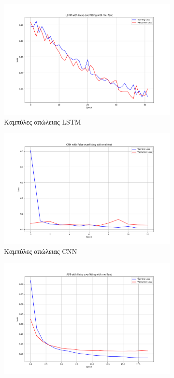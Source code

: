 \documentclass[a4paper,12pt]{article}
\begin{document}
\begin{figure}[H]
    \centering
    \begin{subfigure}[b]{0.32\textwidth}
        \includegraphics[width=\textwidth]{images/LSTM with False overfitting with mel feat.png}
        \caption{Καμπύλες απώλειας LSTM}
    \end{subfigure}
    \hfill
    \begin{subfigure}[b]{0.32\textwidth}
        \includegraphics[width=\textwidth]{images/CNN with False overfitting with mel feat.png}
        \caption{Καμπύλες απώλειας CNN}
    \end{subfigure}
    \hfill
    \begin{subfigure}[b]{0.32\textwidth}
        \includegraphics[width=\textwidth]{images/AST with False overfitting with mel feat.png}

\end{subfigure}
\end{figure}
\end{document}
